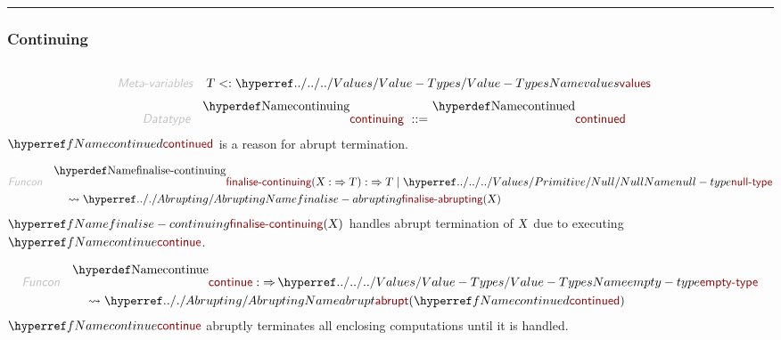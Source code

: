 

\begin{center}
\rule{3in}{0.4pt}
\end{center}

\subsubsection{Continuing}\hypertarget{continuing}{}\label{continuing}

\begin{align*}
  [ \
  \KEY{Datatype} \quad & \NAMEREF{continuing} \\
  \KEY{Funcon} \quad & \NAMEREF{continued} \\
  \KEY{Funcon} \quad & \NAMEREF{finalise-continuing} \\
  \KEY{Funcon} \quad & \NAMEREF{continue} \\
  \KEY{Funcon} \quad & \NAMEREF{handle-continue}
  \ ]
\end{align*}
\begin{align*}
  \KEY{Meta-variables} \quad
  & \VAR{T} <: \NAMEHYPER{../../../Values}{Value-Types}{values}
\end{align*}
\begin{align*}
  \KEY{Datatype} \quad 
  \NAMEDECL{continuing} 
  \ ::= \ & \NAMEDECL{continued}
\end{align*}
$\SHADE{\NAMEREF{continued}}$ is a reason for abrupt termination.

\begin{align*}
  \KEY{Funcon} \quad
  & \NAMEDECL{finalise-continuing}(
                       \VAR{X} :  \TO \VAR{T}) 
    :  \TO \VAR{T}  \mid \NAMEHYPER{../../../Values/Primitive}{Null}{null-type} \\&\quad
    \leadsto \NAMEHYPER{../.}{Abrupting}{finalise-abrupting}
               (  \VAR{X} )
\end{align*}
$\SHADE{\NAMEREF{finalise-continuing}
           (  \VAR{X} )}$ handles abrupt termination of $\SHADE{\VAR{X}}$ due to executing
  $\SHADE{\NAMEREF{continue}}$.

\begin{align*}
  \KEY{Funcon} \quad
  & \NAMEDECL{continue} 
    :  \TO \NAMEHYPER{../../../Values}{Value-Types}{empty-type} \\&\quad
    \leadsto \NAMEHYPER{../.}{Abrupting}{abrupt}
               (  \NAMEREF{continued} )
\end{align*}
$\SHADE{\NAMEREF{continue}}$ abruptly terminates all enclosing computations until it is handled.

